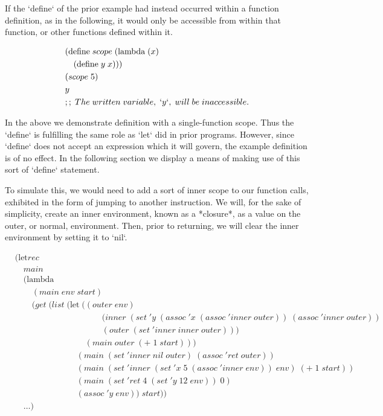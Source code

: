 If the `define` of the prior example had instead occurred within a function definition, 
as in the following, it would only be accessible from within that function, or other 
functions defined within it.

\begin{align*}
& (\text{define} \; scope \; (\text{lambda} \; (x)
\\& \quad (\text{define} \; y \; x)))
\\& (scope \; 5)
\\& y
\\& ;; \; The \; written \; variable, \; `y`, \; will \; be \; inaccessible.
\end{align*}

In the above we demonstrate definition with a single-function scope. Thus the 
`define` is fulfilling the same role as `let` did in prior programs. However, since 
`define` does not accept an expression which it will govern, the example definition 
is of no effect. In the following section we display a means of making use of this 
sort of `define` statement.

To simulate this, we would need to add a sort of inner scope to our function calls, 
exhibited in the form of jumping to another instruction. We will, for the sake of
simplicity, create an inner environment, known as a *closure*, as a value on the
outer, or normal, environment. Then, prior to returning, we will clear the inner 
environment by setting it to `nil`.

\begin{align*}
& (\text{let}rec \; 
\\& \quad main \; 
\\& \quad (\text{lambda} \; 
\\& \qquad (main \; env \; start)
\\& \qquad (get \; (list \; (\text{let} \; ((outer \; env)
\\& \qquad \qquad \qquad \qquad \qquad \; (inner \; (set \; 'y \; (assoc \; 'x \; (assoc \; 'inner \; outer)) \; (assoc \; 'inner \; outer))
\\& \qquad \qquad \qquad \qquad \qquad \; (outer \; (set \; 'inner \; inner \; outer)))
\\& \qquad \qquad \qquad \qquad \; (main \; outer \; (+ \; 1 \; start)))
\\& \qquad \qquad \qquad \quad \; (main \; (set \; 'inner \; nil \; outer) \; (assoc \; 'ret \; outer))
\\& \qquad \qquad \qquad \quad \; (main \; (set \; 'inner \; (set \; 'x \; 5 \; (assoc \; 'inner \; env)) \; env) \; (+ \; 1 \; start))
\\& \qquad \qquad \qquad \quad \; (main \; (set \; 'ret \; 4 \; (set \; 'y \; 12 \; env)) \; 0)
\\& \qquad \qquad \qquad \quad \; (assoc \; 'y \; env)) \; start))
\\& \quad \dots)
\end{align*}

